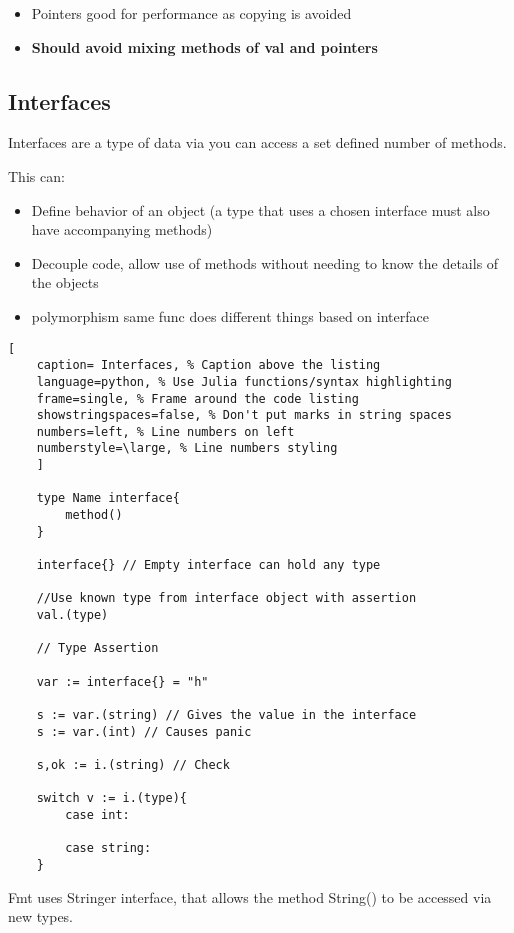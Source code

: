 \documentclass[11pt]{scrartcl} %
\begin{document}
\begin{itemize}
	\item Pointers good for performance as copying is avoided
	\item \textbf{Should avoid mixing methods of val and pointers}
\end{itemize}

\subsection{Interfaces}

Interfaces are a type of data via you can access a set defined number of methods.

This can:
\begin{itemize}
	\item Define behavior of an object (a type that uses a chosen interface must also have 
	accompanying methods)
	\item Decouple code, allow use of methods without needing to know the details of the objects
	\item polymorphism same func does different things based on interface
\end{itemize}

\begin{lstlisting}[
	caption= Interfaces, % Caption above the listing
	language=python, % Use Julia functions/syntax highlighting
	frame=single, % Frame around the code listing
	showstringspaces=false, % Don't put marks in string spaces
	numbers=left, % Line numbers on left
	numberstyle=\large, % Line numbers styling
	]

	type Name interface{
		method()
	}

	interface{} // Empty interface can hold any type

	//Use known type from interface object with assertion
	val.(type)

	// Type Assertion

	var := interface{} = "h"

	s := var.(string) // Gives the value in the interface
	s := var.(int) // Causes panic

	s,ok := i.(string) // Check

	switch v := i.(type){
		case int:

		case string:
	}

\end{lstlisting}

Fmt uses Stringer interface, that allows the method String() to be accessed via new types.
\end{document}
